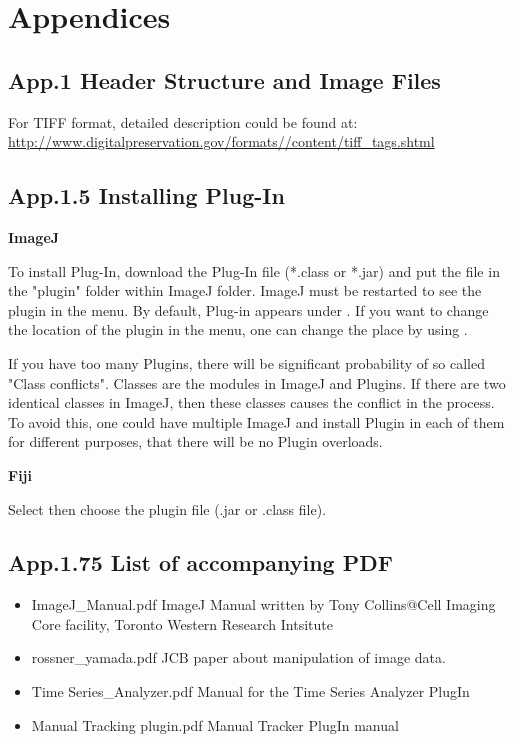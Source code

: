 
\section{Appendices}

\subsection{App.1 Header Structure and Image Files}
\label{app1}

For TIFF format, detailed description could be found at:\\
\url{http://www.digitalpreservation.gov/formats//content/tiff_tags.shtml}

\clearpage

\subsection{App.1.5 Installing Plug-In}
\label{app1.5}
\textbf{ImageJ}

To install Plug-In, download the Plug-In file (*.class or *.jar) and put the file
in the "plugin" folder within ImageJ folder. 
ImageJ must be restarted to see the plugin in the menu. 
By default, Plug-in appears under
\ijmenu{[Plugins]}.
If you want to change the location of the plugin in the menu, one can
change the place by using .

If you have too many Plugins, there will be significant probability of so called
"Class conflicts". Classes are the modules in ImageJ and Plugins. 
If there are two identical classes in
ImageJ, then these classes causes the conflict in the process. To avoid
this, one could have multiple ImageJ and install Plugin in each
of them for different purposes, that there will be no Plugin overloads. 

\textbf{Fiji}

Select   then choose the
plugin file (.jar or .class file). 


\clearpage
\subsection{App.1.75 List of accompanying PDF}
\label{app1.75}
\begin{itemize}
\item ImageJ\_Manual.pdf 
\subitem ImageJ Manual written by Tony Collins@Cell Imaging Core facility,
Toronto Western Research Intsitute

\item rossner\_yamada.pdf
\subitem JCB paper about manipulation of image data.

\item Time Series\_Analyzer.pdf
\subitem Manual for the Time Series Analyzer PlugIn 

\item Manual Tracking plugin.pdf
\subitem Manual Tracker PlugIn manual
\end{itemize}


